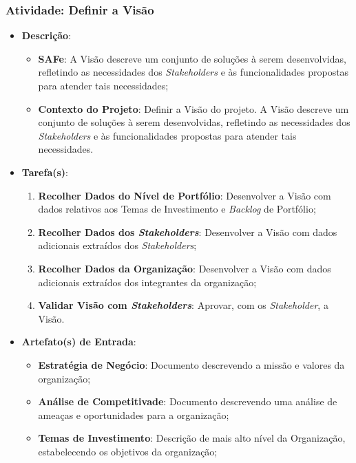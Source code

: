 			\subsubsection[Atividade: Definir a Visão]{Atividade: Definir a Visão}
			\label{subsubsec:processo_atividade_programa_visao}
				\begin{itemize}
					\item{\textbf{Descrição}:
						\begin{itemize}
							\item{\textbf{SAFe}: A Visão descreve um conjunto de soluções à serem desenvolvidas, refletindo as necessidades dos \emph{Stakeholders} e às funcionalidades propostas para atender tais necessidades;}
							\item{\textbf{Contexto do Projeto}: Definir a Visão do projeto. A Visão descreve um conjunto de soluções à serem desenvolvidas, refletindo as necessidades dos \emph{Stakeholders} e às funcionalidades propostas para atender tais necessidades.}
						\end{itemize}}
					\item{\textbf{Tarefa(s)}:
						\begin{enumerate}
							\item{\textbf{Recolher Dados do Nível de Portfólio}: Desenvolver a Visão com dados relativos aos Temas de Investimento e \emph{Backlog} de Portfólio;}
							\item{\textbf{Recolher Dados dos \emph{Stakeholders}}: Desenvolver a Visão com dados adicionais extraídos dos \emph{Stakeholders};}
							\item{\textbf{Recolher Dados da Organização}: Desenvolver a Visão com dados adicionais extraídos dos integrantes da organização;}
							\item{\textbf{Validar Visão com \emph{Stakeholders}}: Aprovar, com os \emph{Stakeholder}, a Visão.}
						\end{enumerate}}
					\item{\textbf{Artefato(s) de Entrada}:
						\begin{itemize}
							\item{\textbf{Estratégia de Negócio}: Documento descrevendo a missão e valores da organização;}
							\item{\textbf{Análise de Competitivade}: Documento descrevendo uma análise de ameaças e oportunidades para a organização;}
							\item{\textbf{Temas de Investimento}: Descrição de mais alto nível da Organização, estabelecendo os objetivos da organização;}

\end{itemize}}
\end{itemize}
